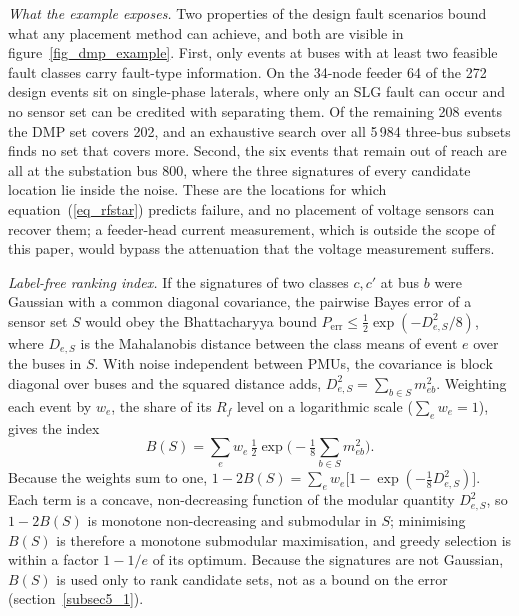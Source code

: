 \documentclass[11pt]{article}
\newenvironment{nw}{}{}
\newcommand{\hlnew}[1]{#1}
\begin{document}
\begin{nw}
\hlnew{\textit{What the example exposes.} Two properties of the design fault scenarios bound what any placement method can achieve, and both are visible in figure~\ref{fig_dmp_example}. First, only events at buses with at least two feasible fault classes carry fault-type information. On the 34-node feeder 64 of the 272 design events sit on single-phase laterals, where only an SLG fault can occur and no sensor set can be credited with separating them. Of the remaining 208 events the DMP set covers 202, and an exhaustive search over all 5\,984 three-bus subsets finds no set that covers more. Second, the six events that remain out of reach are all at the substation bus 800, where the three signatures of every candidate location lie inside the noise. These are the locations for which equation~(\ref{eq_rfstar}) predicts failure, and no placement of voltage sensors can recover them; a feeder-head current measurement, which is outside the scope of this paper, would bypass the attenuation that the voltage measurement suffers.}

\textit{Label-free ranking index.} If the signatures of two classes $c,c'$ at bus $b$ were Gaussian with a common diagonal covariance, the pairwise Bayes error of a sensor set $S$ would obey the Bhattacharyya bound $P_{\mathrm{err}}\le\tfrac12\exp(-D^2_{e,S}/8)$, where $D_{e,S}$ is the Mahalanobis distance between the class means of event $e$ over the buses in $S$. With noise independent between PMUs, the covariance is block diagonal over buses and the squared distance adds, $D_{e,S}^2=\sum_{b\in S}m_{eb}^2$. Weighting each event by $w_e$, the share of its $R_f$ level on a logarithmic scale ($\sum_e w_e=1$), gives the index
\begin{equation}\label{eq10}
B(S)=\sum_e w_e\,\tfrac12\exp\!\Big(-\tfrac18\sum_{b\in S}m_{eb}^2\Big).
\end{equation}
Because the weights sum to one, $1-2B(S)=\sum_e w_e\big[1-\exp(-\tfrac18 D_{e,S}^2)\big]$. Each term is a concave, non-decreasing function of the modular quantity $D_{e,S}^2$, so $1-2B(S)$ is monotone non-decreasing and submodular in $S$; minimising $B(S)$ is therefore a monotone submodular maximisation, and greedy selection is within a factor $1-1/e$ of its optimum. Because the signatures are not Gaussian, $B(S)$ is used only to rank candidate sets, not as a bound on the error (section~\ref{subsec5_1}).
\end{nw}

\end{document}
